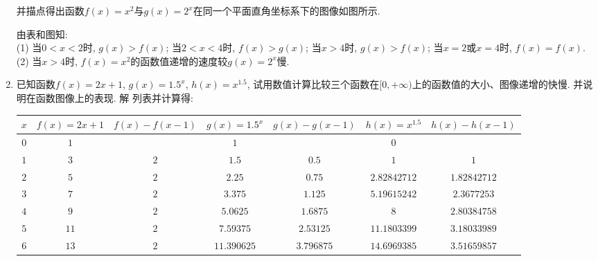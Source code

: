 \documentclass[10pt,a4paper]{article}
\begin{document}
\begin{enumerate}[1.]
\begin{center}
\begin{tabular}{|c|c|c|c|c|}
    \end{tabular}
\end{center}
并描点得出函数$f(x)=x^2$与$g(x)=2^x$在同一个平面直角坐标系下的图像如图所示.
\begin{center}
\end{center}
由表和图知:\\
(1) 当$0<x<2$时, $g(x)>f(x)$; 当$2<x<4$时, $f(x)>g(x)$; 当$x>4$时, $g(x)>f(x)$; 当$x=2$或$x=4$时, $f(x)=f(x)$.
(2) 当$x>4$时, $f(x)=x^2$的函数值递增的速度较$g(x)=2^x$慢.
\item 已知函数$f(x)=2x+1$, $g(x)=1.5^x$, $h(x)=x^{1.5}$, 试用数值计算比较三个函数在$[0,+\infty)$上的函数值的大小、图像递增的快慢. 并说明在函数图像上的表现.
解  列表并计算得:
\begin{center}
    \begin{longtable}{|c|c|c|c|c|c|c|}
        \hline
        $x$	 & $f(x)=2x+1$ & $f(x)-f(x-1)$ & $g(x)=1.5^x$ & $g(x)-g(x-1)$ & $h(x)=x^{1.5}$ & $h(x)-h(x-1)$ \\ \hline
        \endhead
        $0$ & $1$ & & $1$ & & $0$ &  \\ \hline
        $1$ & $3$ & $2$ & $1.5$ & $0.5$ & $1$ & $1$\\ \hline
        $2$ & $5$ & $2$ & $2.25$ & $0.75$ & $2.82842712$ & $1.82842712$\\ \hline
        $3$ & $7$ & $2$ & $3.375$ & $1.125$ & $5.19615242$ & $2.3677253$\\ \hline
        $4$ & $9$ & $2$ & $5.0625$ & $1.6875$ & $8$ & $2.80384758$\\ \hline
        $5$ & $11$ & $2$ & $7.59375$ & $2.53125$ & $11.1803399$ & $3.18033989$\\ \hline
        $6$ & $13$ & $2$ & $11.390625$ & $3.796875$ & $14.6969385$ & $3.51659857$\\ \hline

\end{longtable}
\end{center}
\end{enumerate}
\end{document}
